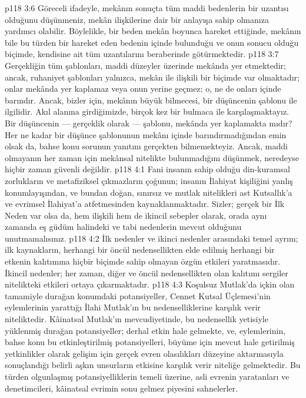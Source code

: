 \vs p118 3:6 Göreceli ifadeyle, mekânın sonuçta tüm maddi bedenlerin bir uzantısı olduğunu düşünmeniz, mekân ilişkilerine dair bir anlayışa sahip olmanıza yardımcı olabilir. Böylelikle, bir beden mekân boyunca hareket ettiğinde, mekânın bile bu türden bir hareket eden bedenin içinde bulunduğu ve onun sonucu olduğu biçimde, kendisine ait tüm uzantılarını beraberinde götürmektedir.
\vs p118 3:7 Gerçekliğin tüm şablonları, maddi düzeyler üzerinde mekânda yer etmektedir; ancak, ruhaniyet şablonları yalnızca, mekân ile ilişkili bir biçimde var olmaktadır; onlar mekânda yer kaplamaz veya onun yerine geçmez; o, ne de onları içinde barındır. Ancak, bizler için, mekânın büyük bilmecesi, bir düşüncenin şablonu ile ilgilidir. Akıl alanına girdiğimizde, birçok kez bir bulmaca ile karşılaşmaktayız. Bir düşüncenin --- gerçeklik olarak --- şablonu, mekânda yer kaplamakta mıdır? Her ne kadar bir düşünce şablonunun mekânı içinde barındırmadığından emin olsak da, bahse konu sorunun yanıtını gerçekten bilmemekteyiz. Ancak, maddi olmayanın her zaman için mekânsal nitelikte bulunmadığını düşünmek, neredeyse hiçbir zaman güvenli değildir.
\vs p118 4:1 Fani insanın sahip olduğu din\hyp{}kuramsal zorlukların ve metafiziksel çıkmazların çoğunun; insanın İlahiyat kişiliğini yanlış konumlayışından, ve bundan doğan, sınırsız ve mutlak nitelikleri ast Kutsallık’a ve evrimsel İlahiyat’a atfetmesinden kaynaklanmaktadır. Sizler; gerçek bir İlk Neden var olsa da, hem ilişkili hem de ikincil sebepler olarak, orada aynı zamanda eş güdüm halindeki ve tabi nedenlerin mevcut olduğunu unutmamalısınız.
\vs p118 4:2 İlk nedenler ve ikinci nedenler arasındaki temel ayrım; ilk kaynakların, herhangi bir öncül nedensellikten elde edilmiş herhangi bir etkenin kalıtımına hiçbir biçimde sahip olmayan özgün etkileri yaratmasıdır. İkincil nedenler; her zaman, diğer ve öncül nedensellikten olan kalıtımı sergiler nitelikteki etkileri ortaya çıkarmaktadır.
\vs p118 4:3 Koşulsuz Mutlak’da içkin olan tamamiyle durağan konumdaki potansiyeller, Cennet Kutsal Üçlemesi’nin eylemlerinin yarattığı İlahi Mutlak’ın bu nedenselliklerine karşılık verir niteliktedir. Kâinatsal Mutlak’ın mevcudiyetinde, bu nedensellik yetisiyle yüklenmiş durağan potansiyeller; derhal etkin hale gelmekte, ve, eylemlerinin, bahse konu bu etkinleştirilmiş potansiyelleri, büyüme için mevcut hale getirilmiş yetkinlikler olarak gelişim için gerçek evren olasılıkları düzeyine aktarmasıyla sonuçlandığı belirli aşkın unsurların etkisine karşılık verir niteliğe gelmektedir. Bu türden olgunlaşmış potansiyelliklerin temeli üzerine, asli evrenin yaratanları ve denetimcileri, kâinatsal evrimin sonu gelmez piyesini sahnelerler.
